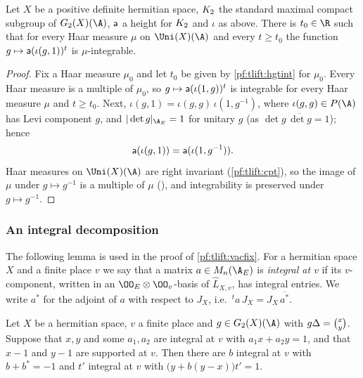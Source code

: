 \begin{proposition}\label{pf:tlift:hgtfst}
Let $X$ be a positive definite hermitian space, $K_2$ the standard maximal compact subgroup of
$G_2(X)(\A)$, $\mathsf{a}$ a height for $K_2$ and $\iota$ as above. There is $t_0\in\R$ such that for every Haar
measure $\mu$ on $\Uni(X)(\A)$ and every $t\ge t_0$ the function $g\mapsto\mathsf{a}(\iota(g,1))^t$ is $\mu$-integrable.
\end{proposition}

\begin{proof}
Fix a Haar measure $\mu_0$ and let $t_0$ be given by \cref{pf:tlift:hgtint} for $\mu_0$. Every Haar measure is a
multiple of $\mu_0$, so $g\mapsto\mathsf{a}(\iota(1,g))^t$ is integrable for every Haar measure $\mu$ and $t\ge t_0$. Next,
$\iota(g,1)=\iota(g,g)\,\iota(1,g^{-1})$, where $\iota(g,g)\in P(\A)$ has Levi component $g$, and
$|\det g|_{\tliftAE}=1$ for unitary $g$ (as $\det g\,\overline{\det g}=1$); hence
\begin{equation}\label{eq:tlift:swap}
  \mathsf{a}(\iota(g,1))=\mathsf{a}(\iota(1,g^{-1})).
\end{equation}
Haar measures on $\Uni(X)(\A)$ are right invariant (\cref{pf:tlift:cpt}), so the image of $\mu$ under $g\mapsto g^{-1}$
is a multiple of $\mu$ (), and integrability is preserved under
$g\mapsto g^{-1}$.
\end{proof}

\subsubsection*{An integral decomposition}
The following lemma is used in the proof of \cref{pf:tlift:vacfix}. For a hermitian space $X$ and a finite place $v$ we say that
a matrix $a\in M_n(\tliftAE)$ is \emph{integral at $v$} if its $v$-component, written in an $\OO_E\otimes\OO_v$-basis of $\widehat L_{X,v}$,
has integral entries. We write $a^*$ for the adjoint of $a$ with respect to $J_X$, i.e.\ ${}^ta\,J_X=J_X\,\overline{a^*}$.

\begin{lemma}\label{pf:tlift:beta}
Let $X$ be a hermitian space, $v$ a finite place and $g\in G_2(X)(\A)$ with $g\Delta={x\choose y}$. Suppose that $x,y$ and some
$a_1,a_2$ are integral at $v$ with $a_1x+a_2y=1$, and that $x-1$ and $y-1$ are supported at $v$. Then there are $b$ integral at $v$
with $b+b^*=-1$ and $t'$ integral at $v$ with $\bigl(y+b(y-x)\bigr)t'=1$.
\end{lemma}

